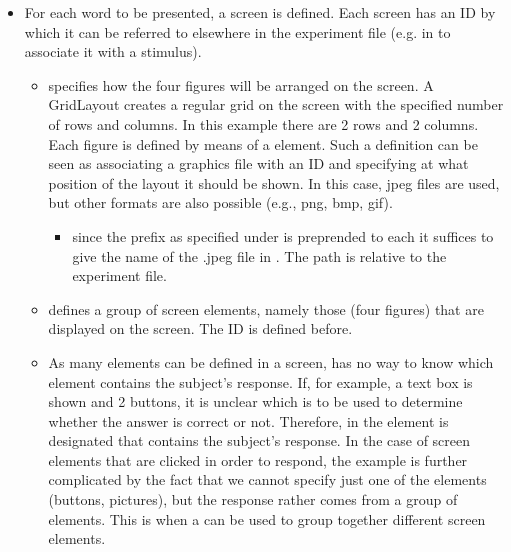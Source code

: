 \begin{itemize}
\item {} For each word to be presented, a screen is
defined. Each screen has an ID by which it can be referred to
elsewhere in the experiment file (e.g. in  to
associate it with a stimulus).
\begin{itemize}

\item {} specifies how the four figures will be
arranged on the screen. A GridLayout creates a regular grid on the
screen with the specified number of rows and columns. In this
example there are 2 rows and 2 columns. Each figure is defined by
means of a  element. Such a definition can be
seen as associating a graphics file with an ID and specifying at
what position of the layout it should be shown. In this case, jpeg
files are used, but other formats are also possible (e.g., png,
bmp, gif).

\begin{itemize}
\item {}


 since the prefix as specified under
 is preprended to each   it
suffices to give the name of the .jpeg file in . The
path is relative to the experiment file.

\end{itemize}
\end{itemize}
\begin{itemize}
\item {} defines a group of screen elements,
namely those (four figures) that are displayed on the screen. The
ID is defined before.

\item {} As many elements can be
defined in a screen, \apex has no way to know which element
contains the subject's response. If, for example, a text box is
shown and 2 buttons, it is unclear which is to be used to
determine whether the answer is correct or not. Therefore, in
 the element is designated that
contains the subject's response. In the case of screen elements
that are clicked in order to respond, the example is further
complicated by the fact that we cannot specify just one of the
elements (buttons, pictures), but the response rather comes from a
group of elements. This is when a  can be
used to group together different screen elements.
\end{itemize}
\end{itemize}
  
  
  
 



